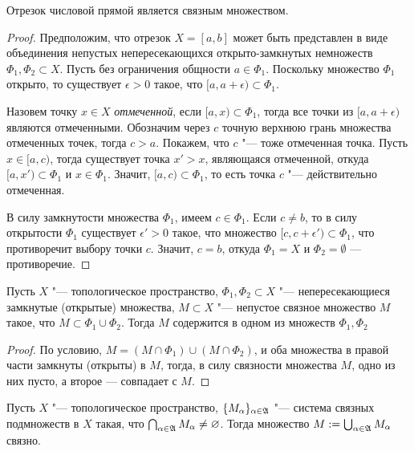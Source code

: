 \begin{theorem}
	Отрезок числовой прямой является связным множеством.
\end{theorem}

\begin{proof}
	Предположим, что отрезок $X = [a, b]$ может быть представлен в виде объединения непустых непересекающихся открыто-замкнутых немножеств $\Phi_1, \Phi_2 \subset X$. Пусть без ограничения общности $a \in \Phi_1$. Поскольку множество $\Phi_1$ открыто, то существует $\epsilon > 0$ такое, что $[a, a+\epsilon)\subset \Phi_1$.
	
	Назовем точку $x \in X$ \textit{отмеченной}, если $[a, x) \subset \Phi_1$, тогда все точки из $[a, a + \epsilon)$ являются отмеченными. Обозначим через $c$ точную верхнюю грань множества отмеченных точек, тогда $c > a$. Покажем, что $c$ "--- тоже отмеченная точка. Пусть $x \in [a, c)$, тогда существует точка $x' > x$, являющаяся отмеченной, откуда $[a, x') \subset \Phi_1$ и $x \in \Phi_1$. Значит, $[a, c) \subset \Phi_1$, то есть точка $c$ "--- действительно отмеченная.
	
	В силу замкнутости множества $\Phi_1$, имеем $c \in \Phi_1$. Если $c \ne b$, то в силу открытости $\Phi_1$ существует $\epsilon'>0$ такое, что множество $[c, c+\epsilon') \subset \Phi_1$, что противоречит выбору точки $c$. Значит, $c = b$, откуда $\Phi_1 = X$ и $\Phi_2 = \emptyset$ --- противоречие.
\end{proof}

\begin{proposition}
	Пусть $X$ "--- топологическое пространство, $\Phi_1, \Phi_2 \subset X$ "--- непересекающиеся замкнутые (открытые) множества, $M \subset X$ "--- непустое связное множество $M$ такое, что $M \subset \Phi_1 \cup \Phi_2$. Тогда $M$ содержится в одном из множеств $\Phi_1, \Phi_2$
\end{proposition}

\begin{proof}
	По условию, $M = (M \cap \Phi_1) \cup (M\cap \Phi_2)$, и оба множества в правой части замкнуты (открыты) в $M$, тогда, в силу связности множества $M$, одно из них пусто, а второе --- совпадает с $M$.
\end{proof}

\begin{theorem} \label{theoremconnectedsum}
	Пусть $X$ "--- топологическое пространство, $\{M_\alpha\}_{\alpha \in \mathfrak A}$ "--- система связных подмножеств в $X$ такая, что $\bigcap_{\alpha \in \mathfrak A}M_\alpha \ne \varnothing$. Тогда множество $M := \bigcup_{\alpha \in \mathfrak A}M_{\alpha}$ связно.
\end{theorem}

